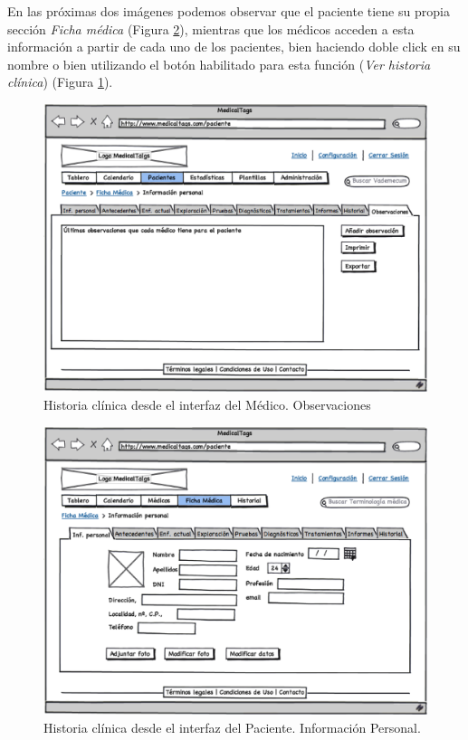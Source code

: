 \documentclass[a4paper,oneside,11pt]{book}
\begin{document}
		En las próximas dos imágenes podemos observar que el paciente tiene su propia sección \textit{Ficha médica} (Figura \ref{fig:hc_paciente}), mientras que los médicos acceden a esta información a partir de cada uno de los pacientes, bien haciendo doble click en su nombre o bien utilizando el botón habilitado para esta función (\textit{Ver historia clínica}) (Figura \ref{fig:hc_medico}).
		
		\begin{figure}[H]
		  \centering
		    \includegraphics[width=12cm]{img/eps/29_1_Historial_Medico.eps}
		  \caption{Historia clínica desde el interfaz del Médico. Observaciones}
		  \label{fig:hc_medico}
		\end{figure}
		
		\begin{figure}[H]
		  \centering
		    \includegraphics[width=12cm]{img/eps/29_Historial_Paciente.eps}
		  \caption{Historia clínica desde el interfaz del Paciente. Información Personal.}
		  \label{fig:hc_paciente}
		\end{figure}
		
\end{document}
